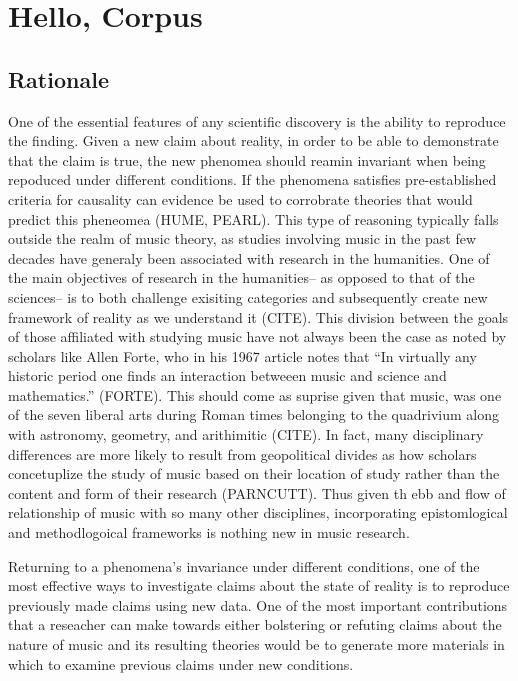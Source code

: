 \documentclass[]{book}
\begin{document}
\hypertarget{hello-corpus}{%
\chapter{Hello, Corpus}\label{hello-corpus}}

\hypertarget{rationale-3}{%
\section{Rationale}\label{rationale-3}}

One of the essential features of any scientific discovery is the ability to reproduce the finding.
Given a new claim about reality, in order to be able to demonstrate that the claim is true, the new phenomea should reamin invariant when being repoduced under different conditions.
If the phenomena satisfies pre-established criteria for causality can evidence be used to corrobrate theories that would predict this pheneomea (HUME, PEARL).
This type of reasoning typically falls outside the realm of music theory, as studies involving music in the past few decades have generaly been associated with research in the humanities.
One of the main objectives of research in the humanities-- as opposed to that of the sciences-- is to both challenge exisiting categories and subsequently create new framework of reality as we understand it (CITE).
This division between the goals of those affiliated with studying music have not always been the case as noted by scholars like Allen Forte, who in his 1967 article notes that ``In virtually any historic period one finds an interaction betweeen music and science and mathematics.'' (FORTE).
This should come as suprise given that music, was one of the seven liberal arts during Roman times belonging to the quadrivium along with astronomy, geometry, and arithimitic (CITE).
In fact, many disciplinary differences are more likely to result from geopolitical divides as how scholars concetuplize the study of music based on their location of study rather than the content and form of their research (PARNCUTT).
Thus given th ebb and flow of relationship of music with so many other disciplines, incorporating epistomlogical and methodlogoical frameworks is nothing new in music research.

Returning to a phenomena's invariance under different conditions, one of the most effective ways to investigate claims about the state of reality is to reproduce previously made claims using new data.
One of the most important contributions that a reseacher can make towards either bolstering or refuting claims about the nature of music and its resulting theories would be to generate more materials in which to examine previous claims under new conditions.
\end{document}
